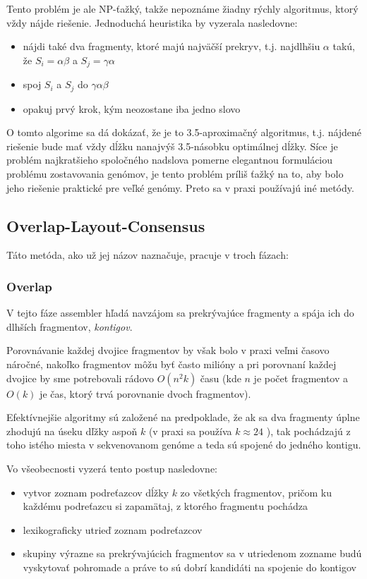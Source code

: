     Tento problém je ale NP-ťažký, takže nepoznáme žiadny rýchly algoritmus,
    ktorý vždy nájde riešenie. Jednoduchá heuristika by vyzerala nasledovne:
    
    \begin{itemize}
        \item nájdi také dva fragmenty, ktoré majú najväčší prekryv, t.j.
        najdlhšiu $\alpha$ takú, že $S_i = \alpha\beta$ a $S_j = \gamma\alpha$
        \item spoj $S_i$ a $S_j$ do $\gamma\alpha\beta$
        \item opakuj prvý krok, kým neozostane iba jedno slovo
    \end{itemize}
    
    O tomto algorime sa dá dokázať, že je to 3.5-aproximačný algoritmus, t.j.
    nájdené riešenie bude mať vždy dĺžku nanajvýš 3.5-násobku optimálnej dĺžky.
    Síce je problém najkratšieho spoločného nadslova pomerne elegantnou
    formuláciou problému zostavovania genómov, je tento problém príliš ťažký na
    to, aby bolo jeho riešenie praktické pre veľké genómy. Preto sa v praxi
    používajú iné metódy.

    \subsection{Overlap-Layout-Consensus}
    Táto metóda, ako už jej názov naznačuje, pracuje v troch fázach:
    
    \subsubsection{Overlap}
    V tejto fáze assembler hľadá navzájom sa prekrývajúce fragmenty a spája ich do dlhších fragmentov, \emph{kontigov}. 
    
    Porovnávanie každej dvojice fragmentov by však bolo v praxi veľmi časovo náročné, nakoľko fragmentov môžu byť často milióny a pri porovnaní každej dvojice by sme potrebovali rádovo $O(n^2k)$ času (kde $n$ je počet fragmentov a $O(k)$ je čas, ktorý trvá porovnanie dvoch fragmentov). 
    
    Efektívnejšie algoritmy sú založené na predpoklade, že ak sa dva fragmenty úplne zhodujú na úseku dľžky aspoň $k$ (v praxi sa používa $k \approx 24$ ), tak pochádzajú z toho istého miesta v sekvenovanom genóme a teda sú spojené do jedného kontigu. 
    
    Vo všeobecnosti vyzerá tento postup nasledovne:
    \begin{itemize}
        \item vytvor zoznam podreťazcov dĺžky $k$ zo všetkých fragmentov, pričom ku každému podreťazcu si zapamätaj, z ktorého fragmentu pochádza
        \item lexikograficky utrieď zoznam podreťazcov
        \item skupiny výrazne sa prekrývajúcich fragmentov sa v utriedenom zozname budú vyskytovať pohromade a práve to sú dobrí kandidáti na spojenie do kontigov
    \end{itemize}
    
